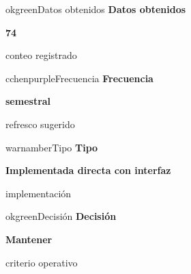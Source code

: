 \documentclass[9pt,a4paper]{extarticle}
\begin{document}
\vspace{0.04cm}
\begin{minipage}{0.24\textwidth}
\begin{metricbox}{okgreen}{Datos obtenidos}
{\large\bfseries Datos obtenidos}\par
{\Large\bfseries 74}\par
{\normalsize conteo registrado}
\end{metricbox}
\end{minipage}\hfill
\begin{minipage}{0.24\textwidth}
\begin{metricbox}{cchenpurple}{Frecuencia}
{\large\bfseries Frecuencia}\par
{\large\bfseries semestral}\par
{\normalsize refresco sugerido}
\end{metricbox}
\end{minipage}\hfill
\begin{minipage}{0.24\textwidth}
\begin{metricbox}{warnamber}{Tipo}
{\large\bfseries Tipo}\par
{\normalsize\bfseries Implementada directa con interfaz}\par
{\normalsize implementación}
\end{metricbox}
\end{minipage}\hfill
\begin{minipage}{0.24\textwidth}
\begin{metricbox}{okgreen}{Decisión}
{\large\bfseries Decisión}\par
{\normalsize\bfseries Mantener}\par
{\normalsize criterio operativo}
\end{metricbox}
\end{minipage}
\end{document}
